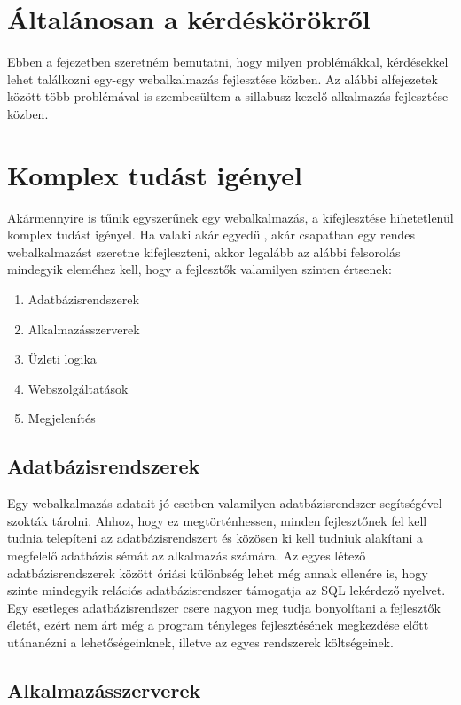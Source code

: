 \documentclass[hidelinks, 12pt, a4paper]{report}
\begin{document}
\section{Általánosan a kérdéskörökről}

Ebben a fejezetben szeretném bemutatni, hogy milyen problémákkal, kérdésekkel lehet találkozni egy-egy webalkalmazás fejlesztése közben. Az alábbi alfejezetek között több problémával is szembesültem a sillabusz kezelő alkalmazás fejlesztése közben.

\section{Komplex tudást igényel}

Akármennyire is tűnik egyszerűnek egy webalkalmazás, a kifejlesztése hihetetlenül komplex tudást igényel. Ha valaki akár egyedül, akár csapatban egy rendes webalkalmazást szeretne kifejleszteni, akkor legalább az alábbi felsorolás mindegyik eleméhez kell, hogy a fejlesztők valamilyen szinten értsenek:
\begin{enumerate}
\item Adatbázisrendszerek
\item Alkalmazásszerverek
\item Üzleti logika
\item Webszolgáltatások
\item Megjelenítés
\end{enumerate}

\subsection{Adatbázisrendszerek}

Egy webalkalmazás adatait jó esetben valamilyen adatbázisrendszer segítségével szokták tárolni. Ahhoz, hogy ez megtörténhessen, minden fejlesztőnek fel kell tudnia telepíteni az adatbázisrendszert és közösen ki kell tudniuk alakítani a megfelelő adatbázis sémát az alkalmazás számára. Az egyes létező adatbázisrendszerek között óriási különbség lehet még annak ellenére is, hogy szinte mindegyik relációs adatbázisrendszer támogatja az SQL lekérdező nyelvet. Egy esetleges adatbázisrendszer csere nagyon meg tudja bonyolítani a fejlesztők életét, ezért nem árt még a program tényleges fejlesztésének megkezdése előtt utánanézni a lehetőségeinknek, illetve az egyes rendszerek költségeinek.


\subsection{Alkalmazásszerverek}
\end{document}

